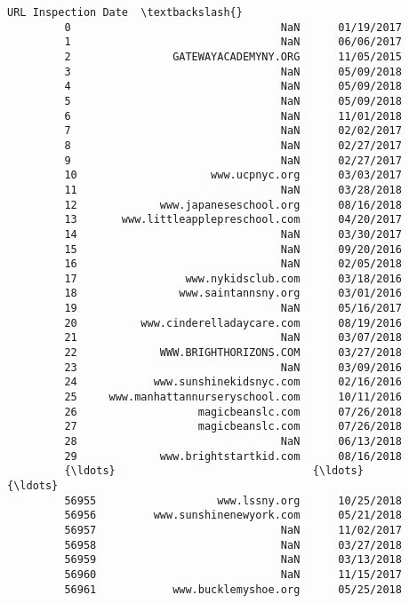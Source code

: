 \documentclass[11pt]{article}
\begin{document}
\begin{Verbatim}[commandchars=\\\{\}]
                                           URL Inspection Date  \textbackslash{}
         0                                 NaN      01/19/2017   
         1                                 NaN      06/06/2017   
         2                GATEWAYACADEMYNY.ORG      11/05/2015   
         3                                 NaN      05/09/2018   
         4                                 NaN      05/09/2018   
         5                                 NaN      05/09/2018   
         6                                 NaN      11/01/2018   
         7                                 NaN      02/02/2017   
         8                                 NaN      02/27/2017   
         9                                 NaN      02/27/2017   
         10                     www.ucpnyc.org      03/03/2017   
         11                                NaN      03/28/2018   
         12             www.japaneseschool.org      08/16/2018   
         13       www.littleapplepreschool.com      04/20/2017   
         14                                NaN      03/30/2017   
         15                                NaN      09/20/2016   
         16                                NaN      02/05/2018   
         17                 www.nykidsclub.com      03/18/2016   
         18                www.saintannsny.org      03/01/2016   
         19                                NaN      05/16/2017   
         20          www.cinderelladaycare.com      08/19/2016   
         21                                NaN      03/07/2018   
         22             WWW.BRIGHTHORIZONS.COM      03/27/2018   
         23                                NaN      03/09/2016   
         24            www.sunshinekidsnyc.com      02/16/2016   
         25     www.manhattannurseryschool.com      10/11/2016   
         26                   magicbeanslc.com      07/26/2018   
         27                   magicbeanslc.com      07/26/2018   
         28                                NaN      06/13/2018   
         29             www.brightstartkid.com      08/16/2018   
         {\ldots}                               {\ldots}             {\ldots}   
         56955                   www.lssny.org      10/25/2018   
         56956         www.sunshinenewyork.com      05/21/2018   
         56957                             NaN      11/02/2017   
         56958                             NaN      03/27/2018   
         56959                             NaN      03/13/2018   
         56960                             NaN      11/15/2017   
         56961            www.bucklemyshoe.org      05/25/2018   

\end{Verbatim}
\end{document}
